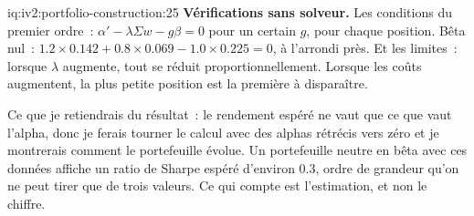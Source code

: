\begin{solution}{iq:iv2:portfolio-construction:25}
\textbf{Vérifications sans solveur.} Les conditions du premier ordre~: $\alpha' - \lambda\Sigma w - g\beta = 0$ pour un certain $g$, pour chaque position. Bêta nul~: $1.2 \times 0.142 + 0.8 \times 0.069 - 1.0 \times 0.225 = 0$, à l'arrondi près. Et les limites~: lorsque $\lambda$ augmente, tout se réduit proportionnellement. Lorsque les coûts augmentent, la plus petite position est la première à disparaître.

Ce que je retiendrais du résultat~: le rendement espéré ne vaut que ce que vaut l'alpha, donc je ferais tourner le calcul avec des alphas rétrécis vers zéro et je montrerais comment le portefeuille évolue. Un portefeuille neutre en bêta avec ces données affiche un ratio de Sharpe espéré d'environ 0.3, ordre de grandeur qu'on ne peut tirer que de trois valeurs. Ce qui compte est l'estimation, et non le chiffre.

\end{solution}
